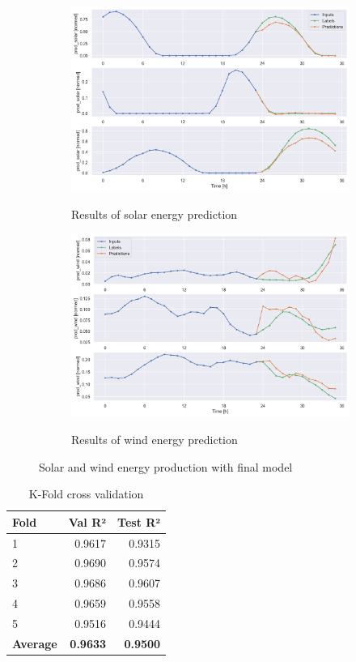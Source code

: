 \documentclass[11pt,table]{article}
\begin{document}
\begin{figure}[H]
\centering
\begin{subfigure}{.5\textwidth}
  \centering
  \includegraphics[width=0.9\linewidth]{Figures/solarResults.png}
  \label{fig:fourierWind}
  \caption{Results of solar energy prediction}
\end{subfigure}%
\begin{subfigure}{.5\textwidth}
  \centering
  \includegraphics[width=0.9\linewidth]{Figures/windResults.png}
  \label{fig:fourierSolar}
  \caption{Results of wind energy prediction}
\end{subfigure}
\caption{Solar and wind energy production with final model}
\label{fig:fourier}
\end{figure}

\begin{table}[H]
\centering
\begin{tabular}{@{}lrr@{}}
\toprule
\textbf{Fold}   & \textbf{Val R²} & \textbf{Test R²} \\ \midrule
\rowcolor[HTML]{FFFFFF} 
1       & 0.9617 & 0.9315  \\
\rowcolor[HTML]{FFFFFF} 
2       & 0.9690 & 0.9574  \\
\rowcolor[HTML]{FFFFFF} 
3       & 0.9686 & 0.9607  \\
\rowcolor[HTML]{FFFFFF} 
4       & 0.9659 & 0.9558  \\
\rowcolor[HTML]{FFFFFF} 
5       & 0.9516 & 0.9444  \\ \midrule
\textbf{Average} & \textbf{0.9633} & \textbf{0.9500} \\ \bottomrule
\end{tabular}
\caption{K-Fold cross validation}
\label{tab:kfold}
\end{table}
\end{document}
